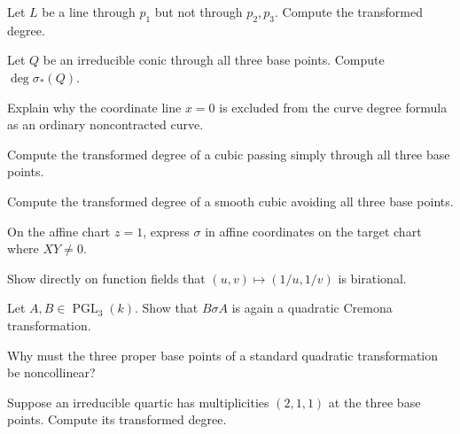 \begin{exercise}\label{exr:vi44-10}
Let \(L\) be a line through \(p_1\) but not through \(p_2,p_3\).  Compute the transformed degree.
\end{exercise}

\begin{exercise}\label{exr:vi44-11}
Let \(Q\) be an irreducible conic through all three base points.  Compute \(\deg\sigma_*(Q)\).
\end{exercise}

\begin{exercise}\label{exr:vi44-12}
Explain why the coordinate line \(x=0\) is excluded from the curve degree formula as an ordinary noncontracted curve.
\end{exercise}

\begin{exercise}\label{exr:vi44-13}
Compute the transformed degree of a cubic passing simply through all three base points.
\end{exercise}

\begin{exercise}\label{exr:vi44-14}
Compute the transformed degree of a smooth cubic avoiding all three base points.
\end{exercise}

\begin{exercise}\label{exr:vi44-15}
On the affine chart \(z=1\), express \(\sigma\) in affine coordinates on the target chart where \(XY\neq0\).
\end{exercise}

\begin{exercise}\label{exr:vi44-16}
Show directly on function fields that \((u,v)\mapsto(1/u,1/v)\) is birational.
\end{exercise}

\begin{exercise}\label{exr:vi44-17}
Let \(A,B\in\operatorname{PGL}_3(k)\).  Show that \(B\sigma A\) is again a quadratic Cremona transformation.
\end{exercise}

\begin{exercise}\label{exr:vi44-18}
Why must the three proper base points of a standard quadratic transformation be noncollinear?
\end{exercise}

\begin{exercise}\label{exr:vi44-19}
Suppose an irreducible quartic has multiplicities \((2,1,1)\) at the three base points.  Compute its transformed degree.
\end{exercise}


